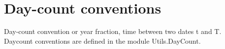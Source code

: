 \documentclass[11pt,a4paper]{article}
\numberwithin{equation}{section}
\begin{document}

	\section{Day-count conventions}

	Day-count convention or year fraction, time between two dates t and T. Daycount conventions are defined in the module Utils.DayCount.
\end{document}
